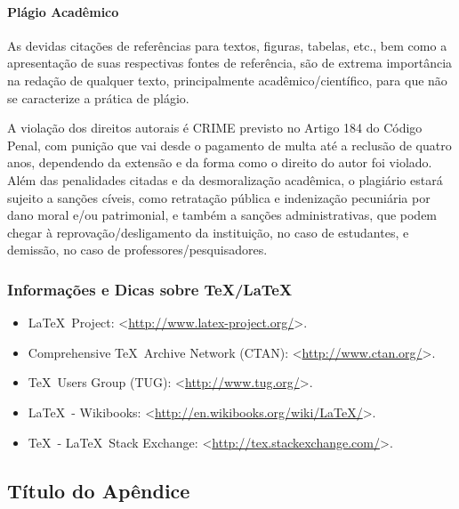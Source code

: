\documentclass[%
  report,%
  10pt,%
  a4paper,%
  fleqn,%
  oneside,%
  sumario = tradicional,%
  chapter = TITLE,%
  section = TITLE,%
]{abntex2}
\begin{document}
\subsubsection{Plágio Acadêmico}\label{sssec:plagio}

As devidas citações de referências para textos, figuras, tabelas, etc., bem como a apresentação de suas respectivas fontes de referência, são de extrema importância na redação de qualquer texto, principalmente acadêmico/científico, para que não se caracterize a prática de plágio.

A violação dos direitos autorais é CRIME previsto no Artigo 184 do Código Penal, com punição que vai desde o pagamento de multa até a reclusão de quatro anos, dependendo da extensão e da forma como o direito do autor foi violado. Além das penalidades citadas e da desmoralização acadêmica, o plagiário estará sujeito a sanções cíveis, como retratação pública e indenização pecuniária por dano moral e/ou patrimonial, e também a sanções administrativas, que podem chegar à reprovação/desligamento da instituição, no caso de estudantes, e demissão, no caso de professores/pesquisadores.

\subsection{Informações e Dicas sobre \TeX/\LaTeX}\label{ssec:texlatex}

\begin{itemize}
\item \LaTeX\ Project: <\url{http://www.latex-project.org/}>.
\item Comprehensive \TeX\ Archive Network (CTAN): <\url{http://www.ctan.org/}>.
\item \TeX\ Users Group (TUG): <\url{http://www.tug.org/}>.
\item \LaTeX\ - Wikibooks: <\url{http://en.wikibooks.org/wiki/LaTeX/}>.
\item \TeX\ - \LaTeX\ Stack Exchange: <\url{http://tex.stackexchange.com/}>.
\end{itemize}

\postextual%

\printbibliography%

\begin{ambienteapendices}%

\chapter{Título do Apêndice}\label{cap:apendicea}

\lipsum[11-15]

\end{ambienteapendices}
\end{document}
